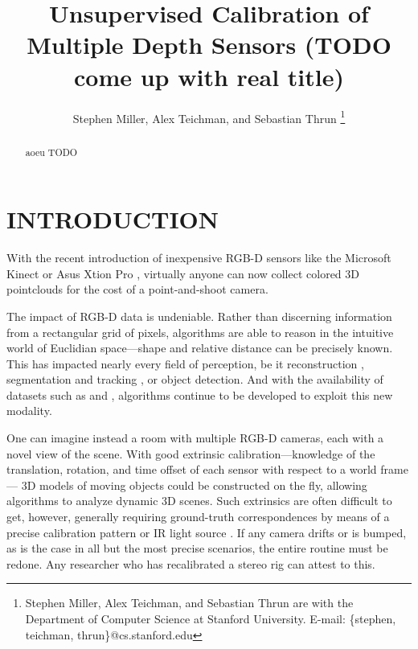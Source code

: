 \documentclass[letterpaper, 10 pt, conference]{ieeeconf}  %
\title{\LARGE \bf
Unsupervised Calibration of Multiple Depth Sensors (TODO come up with real title)}
\author{Stephen Miller, Alex Teichman, and Sebastian Thrun
\thanks{Stephen Miller, Alex Teichman, and Sebastian Thrun are with the Department of Computer Science at Stanford University. \newline E-mail: \{stephen, teichman, thrun\}@cs.stanford.edu } }
\begin{document}
\maketitle
\thispagestyle{empty}
\pagestyle{empty}


\begin{abstract}
aoeu
TODO
\end{abstract}


\section{INTRODUCTION}
\label{sec:intro}
With the recent introduction of inexpensive RGB-D sensors like the Microsoft Kinect \cite{kinect} or Asus Xtion Pro \cite{xtion}, virtually anyone 
can now collect colored 3D pointclouds for the cost of a point-and-shoot camera.

The impact of RGB-D data is undeniable. Rather than discerning information from a rectangular grid of pixels, algorithms 
are able to reason in the intuitive world of Euclidian space---shape and relative distance can be precisely known. 
This has impacted nearly every field of perception, be it reconstruction %
, segmentation and tracking %
, or object detection. %
And with the availability of datasets such as \cite{rgbd-dataset} and \cite{nist-dataset}, algorithms continue to 
be developed to exploit this new modality.


One can imagine instead a room with multiple RGB-D cameras, each with a novel view of the scene. With good 
extrinsic calibration---knowledge of the translation, rotation, and time offset of each sensor with respect to a world frame---
3D models of moving objects could be constructed on the fly, allowing algorithms to analyze dynamic 3D scenes. Such extrinsics 
are often difficult to get, however, generally requiring ground-truth correspondences by means of a precise calibration pattern 
\cite{checkerboard} or IR light source \cite{IRlight}. If any camera drifts or is bumped, as is the case in all but the most precise 
scenarios, the entire routine must be redone. Any researcher who has recalibrated a stereo rig can attest to this.
\end{document}
